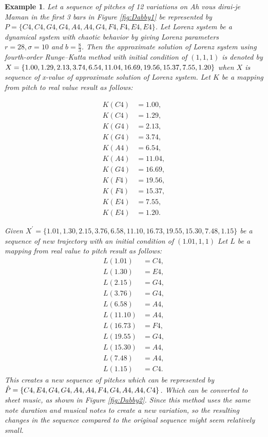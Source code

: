 \documentclass[11pt]{article}
\newtheorem{example}{Example}
\begin{document}
\begin{example}
Let a sequence of pitches of 12 variations on Ah vous dirai-je Maman in the first 3 bars in Figure \ref{fig:Dabby1} be represented by $P = \{C4, C4, G4, G4, A4, A4, G4, F4, F4, E4, E4 \}$. Let Lorenz system be a dynamical system with chaotic behavior by giving Lorenz parameters $r = 28, \sigma=10$ and $b = \frac{8}{3} $. Then the approximate solution of Lorenz system using fourth-order Runge–Kutta method with initial condition of $(1,1,1)$ is denoted by $X = \{1.00, 1.29, 2.13, 3.74, 6.54, 11.04, \\ 16.69, 19.56, 15.37, 7.55, 1.20\}$ when $X$ is sequence of x-value of approximate solution of Lorenz system. Let $K$ be a mapping from pitch to real value result as follows:

\begin{align*}
K(C4) &= 1.00, \\ 
K(C4) &= 1.29, \\
K(G4) &= 2.13, \\
K(G4) &= 3.74, \\
K(A4) &= 6.54, \\
K(A4) &= 11.04, \\
K(G4) &= 16.69, \\
K(F4) &= 19.56, \\
K(F4) &= 15.37, \\
K(E4) &= 7.55, \\
K(E4) &= 1.20. 
\end{align*}

Given $X^\prime = \{ 1.01, 1.30, 2.15, 3.76, 6.58, 11.10, 16.73, 19.55, 15.30, 7.48, 1.15 \}$ be a sequence of new trajectory with an initial condition of $(1.01,1,1)$ Let $L$ be a mapping from real value to pitch result as follows:
\begin{align*}
L(1.01) &= C4, \\
L(1.30) &= E4, \\
L(2.15) &= G4, \\
L(3.76) &= G4, \\
L(6.58) &= A4, \\
L(11.10) &= A4, \\
L(16.73) &= F4, \\
L(19.55) &= G4, \\
L(15.30) &= A4, \\
L(7.48) &= A4, \\
L(1.15) &= C4.
\end{align*}
This creates a new sequence of pitches which can be represented by $\hat{P} =\{C4, E4, G4, G4, A4, A4, \\ F4, G4, A4, A4, C4 \}$. Which can be converted to sheet music, as shown in Figure \ref{fig:Dabby2}. Since this method uses the same note duration and musical notes to create a new variation, so the resulting changes in the sequence compared to the original sequence might seem relatively small.
\end{example}
\end{document}
